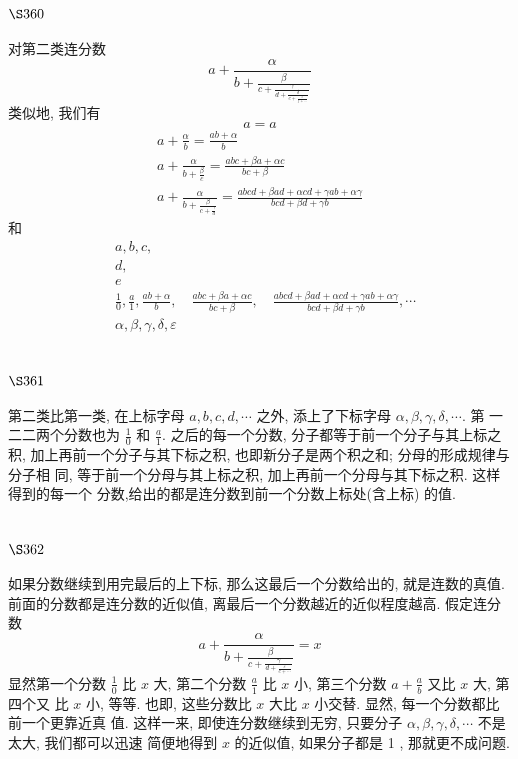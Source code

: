 \section{$\S 360$}

对第二类连分数
\[
a+\frac{\alpha}{b+\frac{\beta}{c+\frac{\gamma}{d+\frac{\delta}{e+\frac{\varepsilon}{f+\cdots}}}}}
\]
类似地, 我们有
\[
a=a
\]
\[
\begin{gathered}
a+\frac{\alpha}{b}=\frac{a b+\alpha}{b} \\
a+\frac{\alpha}{b+\frac{\beta}{c}}=\frac{a b c+\beta a+\alpha c}{b c+\beta} \\
a+\frac{\alpha}{b+\frac{\beta}{c+\frac{\gamma}{d}}}=\frac{a b c d+\beta a d+\alpha c d+\gamma a b+\alpha \gamma}{b c d+\beta d+\gamma b}
\end{gathered}
\]
和
\[
\begin{aligned}
& a, b, c, \\
& d \text {, } \\
& e \\
& \frac{1}{0}, \frac{a}{1}, \frac{a b+\alpha}{b}, \quad \frac{a b c+\beta a+\alpha c}{b c+\beta}, \quad \frac{a b c d+\beta a d+\alpha c d+\gamma a b+\alpha \gamma}{b c d+\beta d+\gamma b}, \cdots \\
& \alpha, \beta, \gamma ,\delta,\varepsilon
\end{aligned}
\]
\section{$\S 361$}

第二类比第一类, 在上标字母 $a, b, c, d, \cdots$ 之外, 添上了下标字母 $\alpha, \beta, \gamma, \delta, \cdots$. 第 一二二两个分数也为 $\frac{1}{0}$ 和 $\frac{a}{1}$. 之后的每一个分数, 分子都等于前一个分子与其上标之积, 加上再前一个分子与其下标之积, 也即新分子是两个积之和; 分母的形成规律与分子相 同, 等于前一个分母与其上标之积, 加上再前一个分母与其下标之积. 这样得到的每一个 分数,给出的都是连分数到前一个分数上标处(含上标) 的值.

\section{$\S 362$}

如果分数继续到用完最后的上下标, 那么这最后一个分数给出的, 就是连数的真值. 前面的分数都是连分数的近似值, 离最后一个分数越近的近似程度越高. 假定连分数
\[
a+\frac{\alpha}{b+\frac{\beta}{c+\frac{\gamma}{d+\frac{\varepsilon}{e+\cdots}}}}=x
\]
显然第一个分数 $\frac{1}{0}$ 比 $x$ 大, 第二个分数 $\frac{a}{1}$ 比 $x$ 小, 第三个分数 $a+\frac{a}{b}$ 又比 $x$ 大, 第四个又 比 $x$ 小, 等等. 也即, 这些分数比 $x$ 大比 $x$ 小交替. 显然, 每一个分数都比前一个更靠近真 值. 这样一来, 即使连分数继续到无穷, 只要分子 $\alpha, \beta, \gamma, \delta, \cdots$ 不是太大, 我们都可以迅速 简便地得到 $x$ 的近似值, 如果分子都是 1 , 那就更不成问题. 

